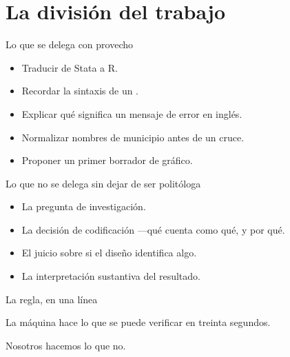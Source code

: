 \section{La división del trabajo}

\begin{frame}{Lo que se delega con provecho}
  \vspace{0.4em}
  \begin{itemize}\setlength{\itemsep}{0.8em}
    \item<1-> Traducir de Stata a R.
    \item<2-> Recordar la sintaxis de un .
    \item<3-> Explicar qué significa un mensaje de error en inglés.
    \item<4-> Normalizar nombres de municipio antes de un cruce.
    \item<5-> Proponer un primer borrador de gráfico.
  \end{itemize}

  \vspace{1.1em}
\end{frame}

\begin{frame}{Lo que no se delega sin dejar de ser politóloga}
  \vspace{0.4em}
  \begin{itemize}\setlength{\itemsep}{0.9em}
    \item<1-> La pregunta de investigación.
    \item<2-> La decisión de codificación —qué cuenta como qué, y por qué.
    \item<3-> El juicio sobre si el diseño identifica algo.
    \item<4-> La interpretación sustantiva del resultado.
  \end{itemize}

  \vspace{1.2em}
\end{frame}

\begin{frame}{La regla, en una línea}
  \vspace{1.2em}
  \begin{saltobox}
    La máquina hace lo que se puede verificar en treinta segundos.

    \vspace{0.6em}
    Nosotros hacemos lo que no.
  \end{saltobox}

  \vspace{1.4em}
\end{frame}

